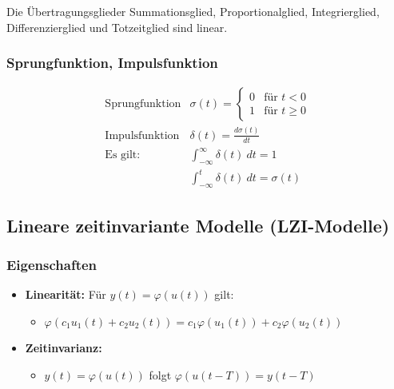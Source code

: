\documentclass[10pt,a4paper]{article}
\renewcommand{\arraystretch}{1.5}
\begin{document}
Die Übertragungsglieder Summationsglied, Proportionalglied, Integrierglied, Differenzierglied und Totzeitglied sind linear.

\subsubsection{Sprungfunktion, Impulsfunktion}
\renewcommand{\arraystretch}{2}
$$
\begin{array}{ll}
	\text{Sprungfunktion} &	\sigma(t) = \begin{cases}
	0 & \text{für } t < 0 \\
	1 & \text{für } t ≥ 0
	\end{cases} \\
	\text{Impulsfunktion} & \delta(t) = \frac{d \sigma(t)}{dt} \\
	\text{Es gilt:} & \int_{-∞}^{∞} \delta(t) ~dt = 1 \\
	& \int_{-∞}^t \delta(t) ~dt = \sigma(t)
\end{array}
$$
\renewcommand{\arraystretch}{1.5}

\subsection{Lineare zeitinvariante Modelle (LZI-Modelle)}
\subsubsection*{Eigenschaften}
\begin{itemize}
	\item \textbf{Linearität:} Für $y(t) = \varphi(u(t))$ gilt:
	\begin{itemize}
		\item $\varphi(c_1 u_1(t) + c_2 u_2(t)) = c_1 \varphi(u_1(t)) + c_2 \varphi(u_2(t))$
	\end{itemize}
	\item \textbf{Zeitinvarianz:}
	\begin{itemize}
		\item $y(t) = \varphi(u(t))$ folgt $\varphi(u(t-T)) = y(t-T)$
	\end{itemize}
\end{itemize}
\end{document}
